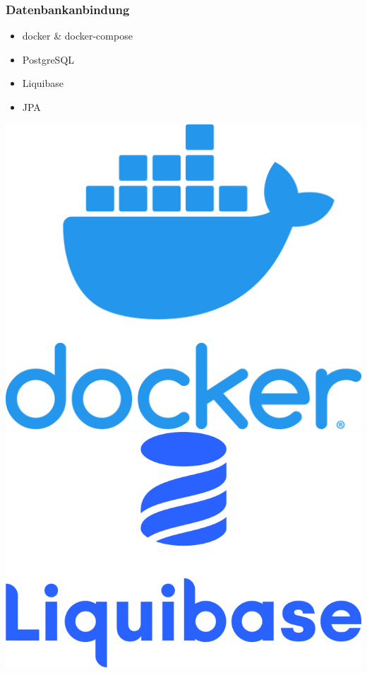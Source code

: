 \begin{frame}
\frametitle{Datenbankanbindung}
\begin{minipage}{0.5\textwidth}
\begin{itemize}
\setlength\itemsep{1em}
\item docker \& docker-compose
\item PostgreSQL
\item Liquibase
\item JPA
\end{itemize}
\end{minipage}
\begin{minipage}{0.49\textwidth}
\begin{center}
\includegraphics[height=0.175\textheight]{docker}\\[12pt]
\includegraphics[height=0.175\textheight]{liquibase}\\[12pt]

\end{center}
\end{minipage}
\end{frame}
